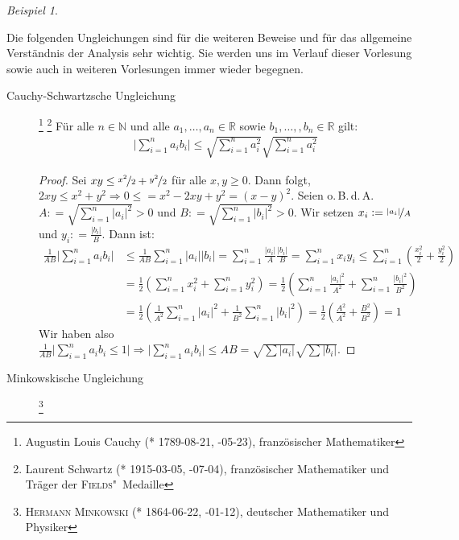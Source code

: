 \documentclass[ngerman,titlepage,twoside, parskip=half*]{scrreprt}
\newcommand*{\N}{\mathbb{N}}
\newcommand*{\R}{\mathbb{R}}
\theoremstyle{plain}
\theoremstyle{definition}
\theoremstyle{remark}
\newtheorem*{beispiel}{Beispiel}
\newcommand*{\abs}[2][]{#1\lvert#2#1\rvert}
\newcommand*{\coloneqq}{\mathrel{\mathop:}=}
\begin{document}
\begin{beispiel}
\begin{enumerate}
\begin{enumerate}[(M1)]
    Die folgenden Ungleichungen sind für die weiteren Beweise und für das
    allgemeine Verständnis der Analysis sehr wichtig. Sie werden uns im
    Verlauf dieser Vorlesung sowie auch in weiteren Vorlesungen immer wieder
    begegnen.
    \begin{description}
    \item[Cauchy-Schwartzsche Ungleichung]\footnote{Augustin Louis Cauchy (*
      1789-08-21, -05-23), französischer Mathematiker}
      \footnote{Laurent Schwartz (* 1915-03-05, -07-04),
	französischer Mathematiker und Träger der \textsc{Fields}"~Medaille}
      Für alle $n\in\N$ und alle $a_1 ,\ldots ,a_n \in \R$ sowie
      $b_{1},\dotsc, ,b_n \in \R$
      gilt:
      \begin{gather*}
	\abs[\bigg]{\sum_{i=1}^n a_i b_i} \leq \sqrt{\sum_{i=1}^n a_i^2}
	   \sqrt{\sum_{i=1}^n a_i^2}
      \end{gather*}
      \begin{proof}
	Sei $xy \leq\nicefrac{x^2}{2}+\nicefrac{y^2}{2}$ für alle $x,y \geq
	0$. Dann folgt, $2xy\leq x^{2}+y^{2}\Rightarrow0 \leq = x^2-2xy+y^2=
	(x-y)^{2}$. Seien o.\,B.\,d.\,A. $A\coloneqq\sqrt{\sum_{i=1}^n
	\abs{a_i}^2}>0$ und $B\coloneqq\sqrt{\sum_{i=1}^n \abs{b_i}^2}>0$. Wir
	setzen $x_i \coloneqq \nicefrac{\abs{a_i}}{A}$ und  $y_i
	\coloneqq\frac{\abs{b_i}}{B}$.  Dann ist:
      \begin{align*}
        \frac{1}{AB}\abs[\bigg]{\sum_{i=1}^n a_i b_i} &\leq
	   \frac{1}{AB}\sum_{i=1}^n \abs{a_i}\abs{b_i} = \sum_{i=1}^n
	   \frac{\abs{a_i}}{A} \frac{\abs{b_i}}{B} = \sum_{i=1}^n x_i y_i
	   \leq \sum_{i=1}^n \left(\frac{x_i^2}{2}+\frac{y_i^2}{2}\right)\\
	&= \frac{1}{2}\left(\sum_{i=1}^n x_i^2 + \sum_{i=1}^n y_i^2\right) =
	   \frac{1}{2} \left( \sum_{i=1}^n \frac{\abs{a_i}^2}{A^2} +
	   \sum_{i=1}^n \frac{\abs{b_i}^2}{B^2}\right)\\
        & = \frac{1}{2} \left( \frac{1}{A^2} \sum_{i=1}^n \abs{a_i}^2 +
	   \frac{1}{B^2} \sum_{i=1}^n \abs{b_i}^2\right) = \frac{1}{2} \left(
	   \frac{A^2}{A^2} + \frac{B^2}{B^2} \right)  = 1
      \end{align*}
	Wir haben also $\frac{1}{AB}\abs{\sum_{i=1}^{n} a_{i}
	b_{i}\leq1}\Rightarrow \abs{\sum_{i=1}^{n}a_{i} b_{i}}\leq AB=
	\sqrt{\sum\abs{a_{i}}} \sqrt{\sum\abs{b_{i}}}$.
      \end{proof}
    \item[Minkowskische Ungleichung]\footnote{\textsc{Hermann Minkowski} (* 1864-06-22, -01-12), deutscher Mathematiker und Physiker}

\end{description}
\end{enumerate}
\end{enumerate}
\end{beispiel}
\end{document}
